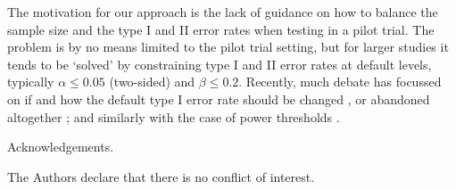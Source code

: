 \documentclass[sagev, Crown]{sagej} %
\begin{document}


The motivation for our approach is the lack of guidance on how to balance the sample size and the type I and II error rates when testing in a pilot trial. The problem is by no means limited to the pilot trial setting, but for larger studies it tends to be `solved' by constraining type I and II error rates at default levels, typically $\alpha \leq 0.05$ (two-sided) and $\beta \leq 0.2$. Recently, much debate has focussed on if and how the default type I error rate should be changed \cite{Benjamin2017}, or abandoned altogether \cite{Amrhein2017, Lakens2018, Amrhein2019}; and similarly with the case of power thresholds \cite{Bacchetti2019}.



\begin{acks}
Acknowledgements.
\end{acks}

\begin{dci}
The Authors declare that there is no conflict of interest.
\end{dci}
\end{document}
